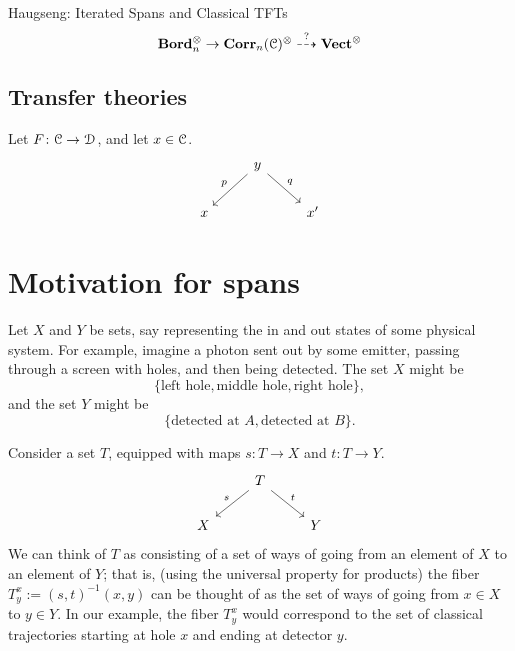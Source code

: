 \documentclass[main.tex]{subfiles}
\begin{document}
Haugseng: Iterated Spans and Classical TFTs
\begin{equation*}
  \mathbf{Bord}_{n}^{\otimes} \rightarrow \mathbf{Corr}_{n}(\mathcal{C})^{\otimes} \overset{?}{\dashrightarrow} \mathbf{Vect}^{\otimes}
\end{equation*}

\subsection{Transfer theories}
\label{ssc:transfer_theories}

Let $F\colon \mathcal{C} \to \mathcal{D}$, and let $x \in \mathcal{C}$.
\begin{equation*}
  \begin{tikzcd}
    & y
    \arrow[dl, swap, "p"]
    \arrow[dr, "q"]
    \\
    x
    && x'
  \end{tikzcd}
\end{equation*}

\section{Motivation for spans}
\label{sec:motivation_for_spans}

Let $X$ and $Y$ be sets, say representing the in and out states of some physical system. For example, imagine a photon sent out by some emitter, passing through a screen with holes, and then being detected. The set $X$ might be
\begin{equation*}
  \{\text{left hole}, \text{middle hole}, \text{right hole}\},
\end{equation*}
and the set $Y$ might be
\begin{equation*}
  \{\text{detected at $A$}, \text{detected at $B$}\}.
\end{equation*}

Consider a set $T$, equipped with maps $s\colon T \to X$ and $t\colon T \to Y$. 
\begin{equation*}
  \begin{tikzcd}
    & T
    \arrow[dl, swap, "s"]
    \arrow[dr, "t"]
    \\
    X
    && Y
  \end{tikzcd}
\end{equation*}
We can think of $T$ as consisting of a set of ways of going from an element of $X$ to an element of $Y$; that is, (using the universal property for products) the fiber $T^{x}_{y} := (s, t)^{-1}(x, y)$ can be thought of as the set of ways of going from $x \in X$ to $y \in Y$. In our example, the fiber $T^{x}_{y}$ would correspond to the set of classical trajectories starting at hole $x$ and ending at detector $y$.
\end{document}
